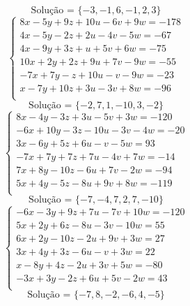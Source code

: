 \documentclass[12pt,oneside,a4paper]{article}
\begin{document}
\begin{equation*}
\text{Solução = }\{-3,-1,6,-1,2,3\}
\end{equation*}
\vspace{\baselineskip}
\begin{equation*}
\begin{cases}
8x-5y+9z+10u-6v+9w=-178 \\
4x-5y-2z+2u-4v-5w=-67 \\
4x-9y+3z+u+5v+6w=-75 \\
10x+2y+2z+9u+7v-9w=-55 \\
-7x+7y-z+10u-v-9w=-23 \\
x-7y+10z+3u-3v+8w=-96 \\
\end{cases}
\end{equation*}
\begin{equation*}
\text{Solução = }\{-2,7,1,-10,3,-2\}
\end{equation*}
\vspace{\baselineskip}
\begin{equation*}
\begin{cases}
8x-4y-3z+3u-5v+3w=-120 \\
-6x+10y-3z-10u-3v-4w=-20 \\
3x-6y+5z+6u-v-5w=93 \\
-7x+7y+7z+7u-4v+7w=-14 \\
7x+8y-10z-6u+7v-2w=-94 \\
5x+4y-5z-8u+9v+8w=-119 \\
\end{cases}
\end{equation*}
\begin{equation*}
\text{Solução = }\{-7,-4,7,2,7,-10\}
\end{equation*}
\vspace{\baselineskip}
\begin{equation*}
\begin{cases}
-6x-3y+9z+7u-7v+10w=-120 \\
5x+2y+6z-8u-3v-10w=55 \\
6x+2y-10z-2u+9v+3w=27 \\
3x+4y+3z-6u-v+3w=22 \\
x-8y+4z-2u+3v+5w=-80 \\
-3x+3y-2z+6u+5v-2w=43 \\
\end{cases}
\end{equation*}
\begin{equation*}
\text{Solução = }\{-7,8,-2,-6,4,-5\}
\end{equation*}
\end{document}

